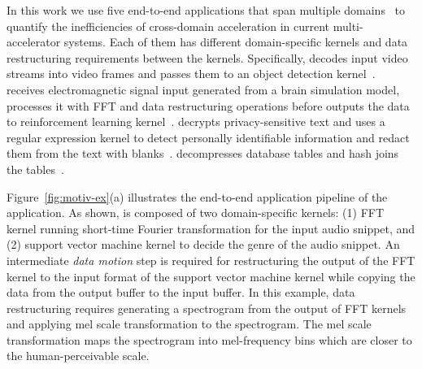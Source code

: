 In this work we use five end-to-end applications that span multiple domains~\cite{acc-yolov3:iscas:2020, urbansound-dataset:mm:2014, rldbs:ijcai:2020, microsoft-presidio,doppiodb:fpl:2017,chiosa:pvldb:2022} to quantify the inefficiencies of cross-domain acceleration in current multi-accelerator systems. Each of them has different domain-specific kernels and data restructuring requirements between the kernels. 
%
Specifically,  decodes input video streams into video frames and passes them to an object detection kernel~\cite{yolov3}.
%    
 receives electromagnetic signal input generated from a brain simulation model, processes it with FFT and data restructuring operations before outputs the data to reinforcement learning kernel~\cite{rldbs:ijcai:2020}.
%   
 decrypts privacy-sensitive text and uses a regular expression kernel to detect personally identifiable information and redact them from the text with blanks~\cite{microsoft-presidio}.
%    
 decompresses database tables and hash joins the tables~\cite{doppiodb:fpl:2017,chiosa:pvldb:2022}.   

Figure~\ref{fig:motiv-ex}(a) illustrates the end-to-end application pipeline of the  application. %
%
As shown,  is composed of two domain-specific kernels:
%
(1) FFT kernel running short-time Fourier transformation for the input audio snippet, and
%
(2) support vector machine kernel to decide the genre of the audio snippet.
%
An intermediate \textit{data motion} step is required for restructuring the output of the FFT kernel to the input format of the support vector machine kernel while copying the data from the output buffer to the input buffer. 
%
In this example, data restructuring requires generating a spectrogram from the output of FFT kernels and applying mel scale transformation to the spectrogram. 
%
The mel scale transformation maps the spectrogram into mel-frequency bins which are closer to the human-perceivable scale.
%

%


